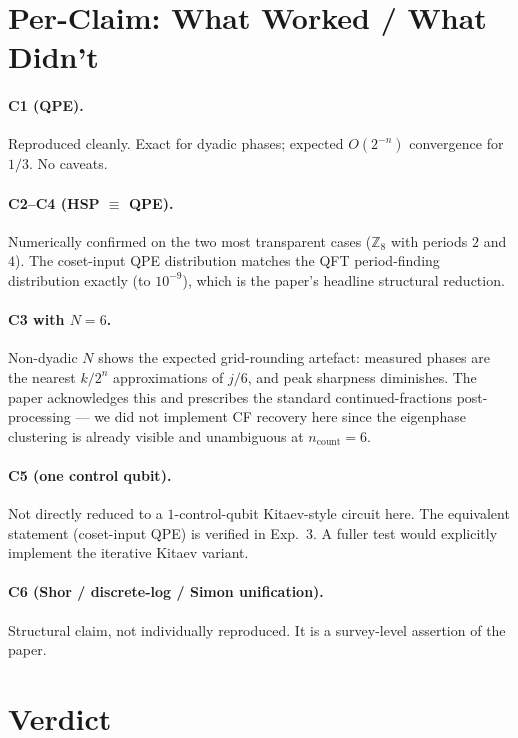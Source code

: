 \documentclass[11pt]{article}
\begin{document}
\section{Per-Claim: What Worked / What Didn't}

\paragraph{C1 (QPE).} Reproduced cleanly. Exact for dyadic phases; expected
$O(2^{-n})$ convergence for $1/3$. No caveats.

\paragraph{C2--C4 (HSP $\equiv$ QPE).} Numerically confirmed on the two most
transparent cases ($\mathbb{Z}_8$ with periods $2$ and $4$). The coset-input QPE
distribution matches the QFT period-finding distribution exactly (to
$10^{-9}$), which is the paper's headline structural reduction.

\paragraph{C3 with $N=6$.} Non-dyadic $N$ shows the expected grid-rounding
artefact: measured phases are the nearest $k/2^n$ approximations of $j/6$, and
peak sharpness diminishes. The paper acknowledges this and prescribes the
standard continued-fractions post-processing --- we did not implement CF
recovery here since the eigenphase clustering is already visible and unambiguous
at $n_{\text{count}}=6$.

\paragraph{C5 (one control qubit).} Not directly reduced to a $1$-control-qubit
Kitaev-style circuit here. The equivalent statement (coset-input QPE) is
verified in Exp.\ 3. A fuller test would explicitly implement the iterative
Kitaev variant.

\paragraph{C6 (Shor / discrete-log / Simon unification).} Structural claim, not
individually reproduced. It is a survey-level assertion of the paper.

\section{Verdict}
\end{document}
